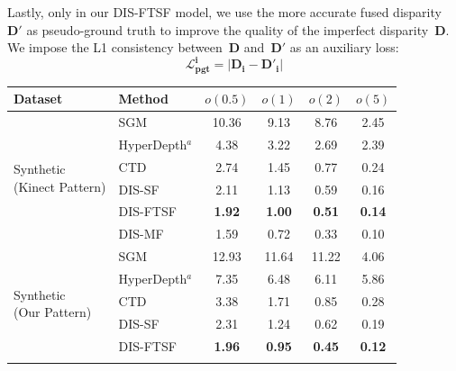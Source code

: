 Lastly, only in our DIS-FTSF model, we use the more accurate fused disparity~$\boldsymbol{D'}$ as pseudo-ground truth to improve the quality of the imperfect disparity~$\boldsymbol{D}$. We impose the L1 consistency between~$\boldsymbol{D}$ and~$\boldsymbol{D'}$ as an auxiliary loss:
\begin{equation}
    \boldsymbol{\mathcal{L}^{i}_{pgt}}=
    |\boldsymbol{D_{i}} - \boldsymbol{D'_{i}}|
\end{equation}

\begin{table}[!t]
    \begin{center}
        \begin{threeparttable}
        \begin{tabular}{l|lcccc}
        \hline
        Dataset & Method & $o(0.5)$ & $o(1)$ & $o(2)$ & $o(5)$ \\
        \hline
        \multirow{6}{*}{ \parbox{20ex}{Synthetic \\ (Kinect Pattern)}} & SGM & 10.36 & \phantom{0}9.13 & \phantom{0}8.76 & \phantom{0}2.45 \\
        & HyperDepth$^a$ & \phantom{0}4.38 & \phantom{0}3.22 & \phantom{0}2.69 & \phantom{0}2.39 \\
        & CTD & \phantom{0}2.74 & \phantom{0}1.45 & \phantom{0}0.77 & \phantom{0}0.24 \\
        & DIS-SF & \phantom{0}2.11 & \phantom{0}1.13 & \phantom{0}0.59 & \phantom{0}0.16 \\
        & DIS-FTSF & \phantom{0}\textbf{1.92} & \phantom{0}\textbf{1.00} & \phantom{0}\textbf{0.51} & \phantom{0}\textbf{0.14} \\
        \arrayrulecolor{lightgray}\cline{2-6}\arrayrulecolor{black}
        & DIS-MF & \phantom{0}1.59 & \phantom{0}0.72 & \phantom{0}0.33 & \phantom{0}0.10 \\
        \hline
        \hline
        \multirow{6}{*}{ \parbox{20ex}{Synthetic \\ (Our Pattern)} } & SGM & 12.93 & 11.64 & 11.22 & \phantom{0}4.06 \\
        & HyperDepth$^a$ & \phantom{0}7.35 & \phantom{0}6.48 & \phantom{0}6.11 & \phantom{0}5.86 \\
        & CTD & \phantom{0}3.38 & \phantom{0}1.71 & \phantom{0}0.85 & \phantom{0}0.28 \\
        & DIS-SF & \phantom{0}2.31 & \phantom{0}1.24 & \phantom{0}0.62 & \phantom{0}0.19 \\
        & DIS-FTSF & \phantom{0}\textbf{1.96} & \phantom{0}\textbf{0.95} & \phantom{0}\textbf{0.45} & \phantom{0}\textbf{0.12} \\ \arrayrulecolor{lightgray}\cline{2-6}\arrayrulecolor{black}

\end{tabular}
\end{threeparttable}
\end{center}
\end{table}
